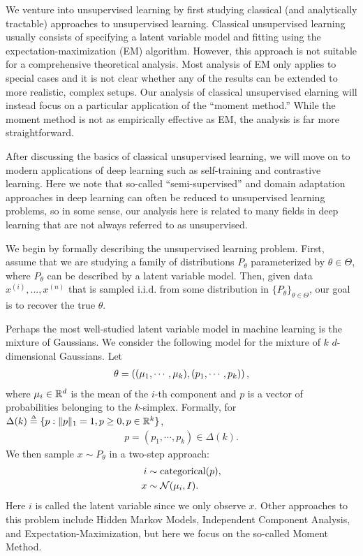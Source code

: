 
We venture into unsupervised learning by first studying classical (and analytically tractable) approaches to unsupervised learning. Classical unsupervised learning usually consists of specifying a latent variable model and fitting using the expectation-maximization (EM) algorithm. However, this approach is not suitable for a comprehensive theoretical analysis. Most analysis of EM only applies to special cases and it is not clear whether any of the results can be extended to more realistic, complex setups. Our analysis of classical unsupervised elarning will instead focus on a particular application of the ``moment method.'' While the moment method is not as empirically effective as EM, the analysis is far more straightforward. 

After discussing the basics of classical unsupervised learning, we will move on to modern applications of deep learning such as self-training and contrastive learning. Here we note that so-called ``semi-supervised'' and domain adaptation approaches in deep learning can often be reduced to unsupervised learning problems, so in some sense, our analysis here is related to many fields in deep learning that are not always referred to as unsupervised. 


We begin by formally describing the unsupervised learning problem. First, assume that we are studying a family of distributions $P_{\theta}$ parameterized by $\theta \in \Theta$, where $P_{\theta}$ can be described by a latent variable model. Then, given data $x^{(i)},...,x^{(n)}$ that is sampled i.i.d. from some distribution in $\{P_\theta\}_{\theta \in \Theta}$, our goal is to recover the true $\theta$. 

Perhaps the most well-studied latent variable model in machine learning is the mixture of Gaussians. We consider the following model for the mixture of $k$ $d$-dimensional Gaussians. Let 
\begin{align}
\theta = \left ( (\mu_1, \cdots, \mu_k), (p_1, \cdots, p_k)\right ),
\end{align}
where $\mu_i\in \mathbb R^d$ is the mean of the $i$-th component and $p$ is a vector of probabilities belonging to the $k$-simplex. Formally, for $\Delta(k) \defeq \{ p: \|p\|_1 = 1, p\geq 0, p\in\R^k\}$, 
\begin{align}
    p = (p_1, \cdots, p_k) \in \Delta(k).
\end{align}
We then sample $x \sim P_\theta$ in a two-step approach: 
\begin{align}
    i &\sim \text{categorical}(p), \notag\\
    x &\sim \mathcal N(\mu_i, I).
\end{align}
Here $i$ is called the latent variable since we only observe $x$. Other approaches to this problem include Hidden Markov Models, Independent Component Analysis, and Expectation-Maximization, but here we focus on the so-called Moment Method.


